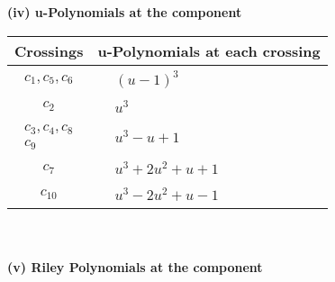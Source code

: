 \documentclass[1p]{elsarticle_modified}
\theoremstyle{definition}
\begin{document}
\newpage\renewcommand{\arraystretch}{1}
\flushleft \textbf{(iv) u-Polynomials at the component}\newline \\
\begin{tabular}{m{50pt}|m{274pt}}
Crossings & \hspace{64pt}u-Polynomials at each crossing \\
\hline $$\begin{aligned}c_{1},c_{5},c_{6}\end{aligned}$$&$\begin{aligned}
&(u-1)^3
\end{aligned}$\\
\hline $$\begin{aligned}c_{2}\end{aligned}$$&$\begin{aligned}
&u^3
\end{aligned}$\\
\hline $$\begin{aligned}c_{3},c_{4},c_{8}\\c_{9}\end{aligned}$$&$\begin{aligned}
&u^3- u+1
\end{aligned}$\\
\hline $$\begin{aligned}c_{7}\end{aligned}$$&$\begin{aligned}
&u^3+2 u^2+u+1
\end{aligned}$\\
\hline $$\begin{aligned}c_{10}\end{aligned}$$&$\begin{aligned}
&u^3-2 u^2+u-1
\end{aligned}$\\
\hline
\end{tabular}\\~\\
\newpage\renewcommand{\arraystretch}{1}
\flushleft \textbf{(v) Riley Polynomials at the component}\newline \\
\end{document}
